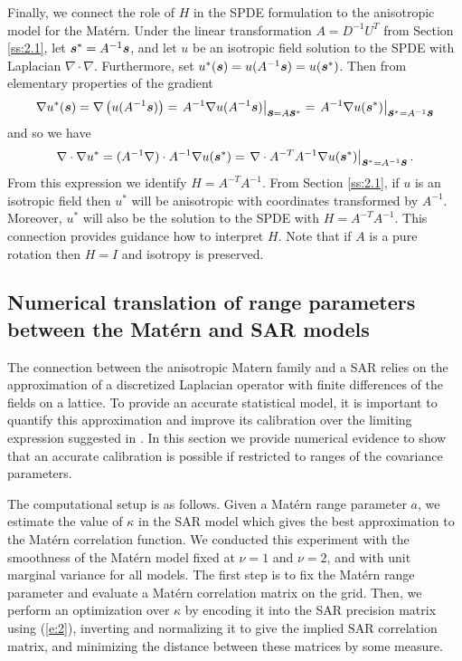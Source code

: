 \documentclass[review]{elsarticle}
\begin{document}
Finally, we connect  the role of $H$ in the SPDE formulation to the anisotropic model for the Mat\'ern.   Under the linear transformation $A=D^{-1}U^T$ from Section \ref{ss:2.1},  let $\mbox{\boldmath $s$}^* =  A^{-1}  \mbox{\boldmath $s$} $, and let $u$ be an isotropic field solution to the SPDE with Laplacian $\nabla \cdot \nabla$. Furthermore, set $u^*(\mbox{\boldmath $s$}) = u(A^{-1} \mbox{\boldmath $s$}) = u(\mbox{\boldmath $s$}^*)$. 
 Then from elementary properties of the gradient 
\[ \nabla u^*( \mbox{\boldmath $s$}) = \nabla \left( u( A^{-1} \mbox{\boldmath $s$}) \right) =  \left. A^{-1} \nabla u(A^{-1} \mbox{\boldmath $s$}) \right| _{\mbox{\boldmath $s$}= A \mbox{\boldmath $s$}^*} =  \left. A^{-1} \nabla u( \mbox{\boldmath $s$}^*) \right| _{\mbox{\boldmath $s$}^*= A^{-1} \mbox{\boldmath $s$}}  \] %
 and so we have  
 \[ \nabla \cdot \nabla u^* =  (A ^{-1}\nabla) \cdot A^{-1} \nabla u(\mbox{\boldmath $s$}^*)  =  \left. \nabla \cdot A^{-T} A^{-1} \nabla u(\mbox{\boldmath $s$}^*) \right| _{\mbox{\boldmath $s$}^*= A^{-1} \mbox{\boldmath $s$}} . \] 
 From this expression we identify $H= A^{-T}A^{-1}$.  From Section \ref{ss:2.1}, if $u$ is an isotropic field then $u^*$ will be anisotropic with coordinates transformed by $A^{-1}$. Moreover, $u^*$ will also be the solution to the SPDE with $H= A^{-T}A^{-1}$. This connection provides guidance how to interpret $H$. Note that if $A$ is a pure rotation then $H=I$ and isotropy is preserved.  



\subsection{Numerical translation of range parameters between the Mat\'ern and SAR models}
\label{ss:1}

The connection between the anisotropic Matern family and a SAR relies on the approximation of a discretized Laplacian operator with finite differences of the fields on a lattice.  To provide an accurate statistical model, it is important to quantify this approximation and improve its calibration over the limiting expression suggested in \cite{lindgren2011explicit}. In this section we provide numerical evidence to show that an accurate calibration is possible if restricted to ranges of the covariance parameters. 

The  computational setup is as follows. Given a Mat\'ern range parameter $a$, we estimate the value of  $\kappa$ in the SAR model which gives the best approximation to the Mat\'ern correlation function.  We conducted this experiment with the smoothness of the Mat\'ern model fixed at $\nu=1$ and $\nu=2$, and with unit marginal variance for all models. The first step is to fix the Mat\'ern range parameter and evaluate a Mat\'ern correlation matrix on the grid. Then, we perform an optimization over $\kappa$ by encoding it into the SAR precision matrix using (\ref{e:2}), inverting and normalizing it to give the implied SAR correlation matrix, and minimizing the distance between these matrices by some measure.
\end{document}
